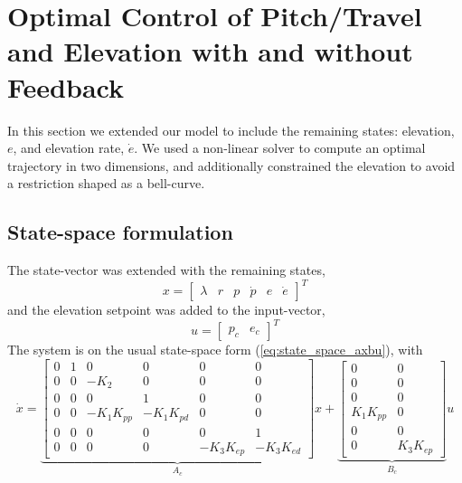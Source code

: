 \section{Optimal Control of Pitch/Travel and Elevation with and without Feedback}\label{sec:prob4}
In this section we extended our model to include the remaining states: elevation, $e$, and elevation
rate, $\dot{e}$. We used a non-linear solver to compute an optimal trajectory in two dimensions,
and additionally constrained the elevation to avoid a restriction shaped as a bell-curve.

\subsection{State-space formulation}
The state-vector was extended with the remaining states,
\begin{equation}
\label{eq:day4_cost}
    x = \begin{bmatrix} \lambda & r & p & \dot{p} & e & \dot{e} \end{bmatrix}^T
\end{equation}
and the elevation setpoint was added to the input-vector,
\begin{equation}
    u = \begin{bmatrix} p_c & e_c \end{bmatrix}^T
\end{equation}
The system is on the usual state-space form (\ref{eq:state_space_axbu}),
with
\begin{equation}
    \dot{x} =
    \underbrace{
    \begin{bmatrix}
    0 & 1 &      0     &      0     &      0     &      0    \\
    0 & 0 &    -K_2    &      0     &      0     &      0    \\
    0 & 0 &      0     &      1     &      0     &      0    \\
    0 & 0 & -K_1K_{pp} & -K_1K_{pd} &      0     &      0    \\
    0 & 0 &      0     &      0     &      0     &      1    \\
    0 & 0 &      0     &      0     & -K_3K_{ep} & -K_3K_{ed}
    \end{bmatrix}}_{A_c}
    x +
    \underbrace{
    \begin{bmatrix}
        0       &     0     \\
        0       &     0     \\
        0       &     0     \\
    K_1K_{pp}   &     0     \\
        0       &     0     \\
        0       & K_3K_{ep}
    \end{bmatrix}}_{B_c}
    u
    \label{eq:extended_state_space}
\end{equation}

